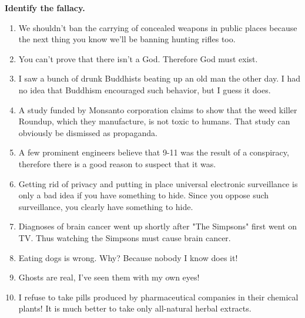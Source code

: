 \documentclass[]{article}
\newcommand{\wide}{\setlength{\parskip}{12mm}}
\begin{document}
\textbf{Identify the fallacy.}

\begin{enumerate}\wide
\item We shouldn't ban the carrying of concealed weapons in public places because the next thing you know we'll be banning hunting rifles too.

\item You can't prove that there isn't a God. Therefore God must exist.

\item I saw a bunch of drunk Buddhists beating up an old man the other day. I had no idea that Buddhism encouraged such behavior, but I guess it does.

\item A study funded by Monsanto corporation claims to show that the weed killer Roundup, which they manufacture, is not toxic to humans. That study can obviously be dismissed as propaganda.

\item A few prominent engineers believe that 9-11 was the result of a conspiracy, therefore there is a good reason to suspect that it was.

\item Getting rid of privacy and putting in place universal electronic surveillance is only a bad idea if you have something to hide. Since you oppose such surveillance, you clearly have something to hide.

\item Diagnoses of brain cancer went up shortly after "The Simpsons" first went on TV. Thus watching the Simpsons must cause brain cancer.

\item Eating dogs is wrong. Why? Because nobody I know does it!

\item Ghosts are real, I've seen them with my own eyes!

\item I refuse to take pills produced by pharmaceutical companies in their chemical plants! It is much better to take only all-natural herbal extracts.

\end{enumerate}

\pagebreak
\end{document}
